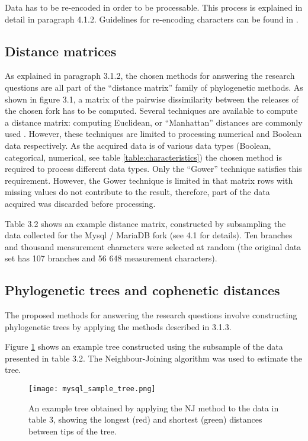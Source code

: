 Data has to be re-encoded in order to be processable. This process is explained in detail in paragraph 4.1.2. Guidelines for re-encoding characters can be found in \citet{Sokal1986a}.

\subsection{Distance matrices}
As explained in paragraph 3.1.2, the chosen methods for answering the research questions are all part of the “distance matrix” family of phylogenetic methods. As shown in figure 3.1, a matrix of the pairwise dissimilarity between the releases of the chosen fork has to be computed. Several techniques are available to compute a distance matrix: computing Euclidean, or “Manhattan” distances are commonly used \citep{Felsenstein1982a}. However, these techniques are limited to processing numerical and Boolean data respectively. As the acquired data is of various data types (Boolean, categorical, numerical, see table \ref{table:characteristics}) the chosen method is required to process different data types. Only the “Gower” technique \citep{DOrazio2016} satisfies this requirement. However, the Gower technique is limited in that matrix rows with missing values do not contribute to the result, therefore, part of the data acquired was discarded before processing.

Table 3.2 shows an example distance matrix, constructed by subsampling the data collected for the Mysql / MariaDB fork (see 4.1 for details). Ten branches and thousand measurement characters were selected at random (the original data set has 107 branches and 56 648 measurement characters).

\subsection{Phylogenetic trees and cophenetic distances}
The proposed methods for answering the research questions involve constructing phylogenetic trees by applying the methods described in 3.1.3.

Figure \ref{fig:sample_tree} shows an example tree constructed using the subsample of the data presented in table 3.2. The Neighbour-Joining algorithm \citep{Saitou1987a} was used to estimate the tree.

\begin{figure}[H]
  \centering
  \texttt{[image: mysql\_sample\_tree.png]}
  \caption{An example tree obtained by applying the NJ method to the data in table 3, showing the longest (red) and shortest (green) distances between tips of the tree.}
  \label{fig:sample_tree}
\end{figure}

